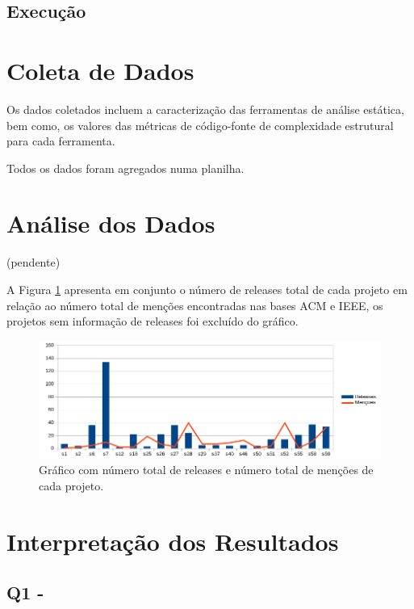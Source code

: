 \subsection{Execução}

\section{Coleta de Dados} \label{estudo3:coleta}

Os dados coletados incluem a caracterização das ferramentas de análise
estática, bem como, os valores das métricas de código-fonte de complexidade
estrutural para cada ferramenta.

Todos os dados foram agregados numa planilha.

\section{Análise dos Dados} \label{estudo3:analise}

(pendente)

A Figura \ref{releases-vs-mentions} apresenta em conjunto o número de releases total
de cada projeto em relação ao número total de menções encontradas nas bases ACM e IEEE,
os projetos sem informação de releases foi excluído do gráfico.

\begin{figure}[h]
  \center
  \includegraphics[scale=0.6]{imagens/releases-vs-mentions.png}
  \caption{Gráfico com número total de releases e número total de menções de cada projeto.}
  \label{releases-vs-mentions}
\end{figure}

\section{Interpretação dos Resultados} \label{estudo3:interpretacao}

\subsection{Q1 - \EstudoDoisQuestaoUm}

